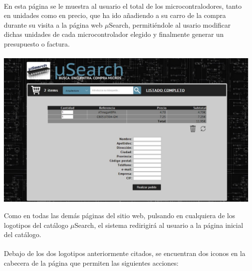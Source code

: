\paragraph{}En esta página se le muestra al usuario el total de los microcontralodores, tanto en unidades como en precio, que ha ido añadiendo a su carro de la compra durante su visita a la página web $\mu$Search, permitiéndole al usario modificar dichas unidades de cada microcontrolador elegido y finalmente generar un presupuesto o factura.

\begin{center}
	\paragraph{}\includegraphics[scale=0.35]{img/carrito}\singlelinebreak
\end{center}

Como en todas las demás páginas del sitio web, pulsando en cualquiera de los logotipos del catálogo $\mu$Search, el sistema redirigirá al usuario a la página inicial del catálogo.

\paragraph{}Debajo de los dos logotipos anteriormente citados, se encuentran dos iconos en la cabecera de la página que permiten las siguientes acciones:

